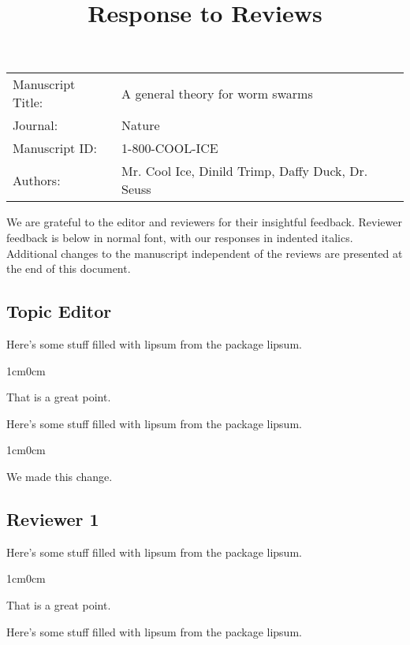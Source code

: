 \documentclass{article}
\title{Response to Reviews}
\newenvironment{response}
	{
	\begin{adjustwidth}{1cm}{0cm}
	\itshape %
	}
	{
	\end{adjustwidth}
	}
\begin{document}
\maketitle


\begin{tabular}{ l l }
Manuscript Title: &
A general theory for worm swarms
\\
Journal: &
Nature
\\
Manuscript ID: &
1-800-COOL-ICE
\\
Authors:  &
Mr. Cool Ice, Dinild Trimp, Daffy Duck, Dr. Seuss
\\
\end{tabular}

\bigskip

We are grateful to the editor and reviewers for their insightful feedback.
Reviewer feedback is below in normal font, with our responses in indented italics.
Additional changes to the manuscript independent of the reviews are presented at the end of this document.

\subsection*{Topic Editor}
Here's some stuff filled with lipsum from the package lipsum. \lipsum[2]
\begin{response}
  That is a great point. \\
\end{response}


Here's some stuff filled with lipsum from the package lipsum. \lipsum[2]

\begin{response}
  We made this change. \\
\end{response}


\subsection*{Reviewer 1}
Here's some stuff filled with lipsum from the package lipsum. \lipsum[2]
\begin{response}
  That is a great point. \\
\end{response}

Here's some stuff filled with lipsum from the package lipsum. \lipsum[2]
\end{document}
